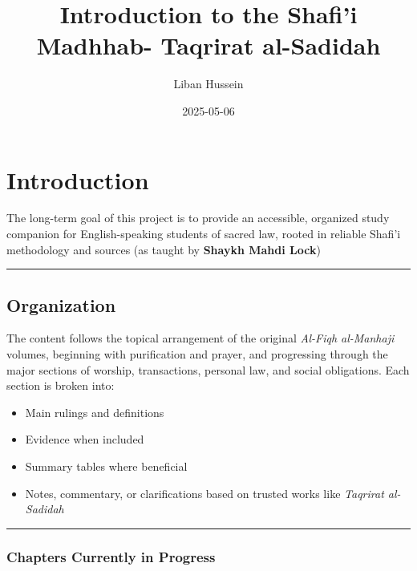 \documentclass[
  a4paper,
  DIV=11,
  numbers=noendperiod]{scrartcl}
\title{Introduction to the Shafi'i Madhhab- Taqrirat al-Sadidah}
\author{Liban Hussein}
\date{2025-05-06}
\providecommand{\tightlist}{%
  \setlength{\itemsep}{0pt}\setlength{\parskip}{0pt}}
\renewcommand*\contentsname{Table of contents}
\newcommand\contentsname{Table of contents}
\begin{document}
\maketitle

\renewcommand*\contentsname{Table of contents}
{
\hypersetup{linkcolor=}
\setcounter{tocdepth}{3}
\tableofcontents
}

\section{Introduction}\label{sec-intro}

The long-term goal of this project is to provide an accessible,
organized study companion for English-speaking students of sacred law,
rooted in reliable Shafi'i methodology and sources (as taught by
\textbf{Shaykh Mahdi Lock})

\begin{center}\rule{0.5\linewidth}{0.5pt}\end{center}

\subsection{Organization}\label{organization}

The content follows the topical arrangement of the original
\emph{Al-Fiqh al-Manhaji} volumes, beginning with purification and
prayer, and progressing through the major sections of worship,
transactions, personal law, and social obligations. Each section is
broken into:

\begin{itemize}
\tightlist
\item
  Main rulings and definitions\\
\item
  Evidence when included\\
\item
  Summary tables where beneficial\\
\item
  Notes, commentary, or clarifications based on trusted works like
  \emph{Taqrirat al-Sadidah}
\end{itemize}

\begin{center}\rule{0.5\linewidth}{0.5pt}\end{center}

\subsubsection{Chapters Currently in
Progress}\label{chapters-currently-in-progress}
\end{document}
